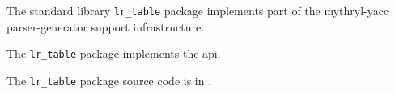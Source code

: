 
The standard library {\tt lr\_table} package implements part of the mythryl-yacc parser-generator support infrastructure.

The {\tt lr\_table} package implements the  api.

The {\tt lr\_table} package source code is in .


